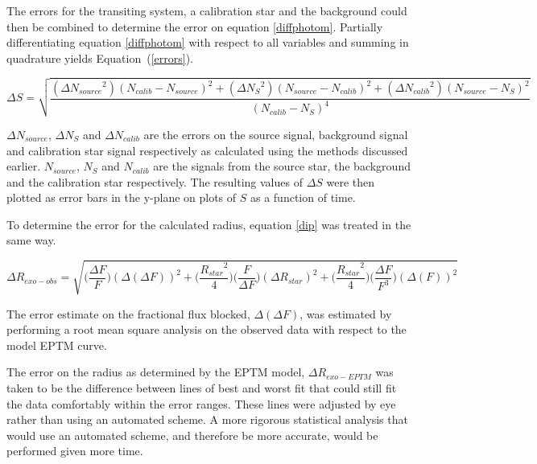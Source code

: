 \documentclass{report}
\begin{document}
The errors for the transiting system, a calibration star and the background could then be combined to determine the error on equation \ref{diffphotom}. Partially differentiating equation \ref{diffphotom} with respect to all variables and summing in quadrature yields Equation~(\ref{errors}).

\begin{equation} \label{errors}
    {\Delta S} = \sqrt{\frac{({\Delta N_{source}}^{2})(N_{calib}-N_{source})^{2} + ({\Delta N_{S}}^{2})(N_{source}-N_{calib})^2 + ({\Delta N_{calib}}^{2})(N_{source}-N_{S})^2}{(N_{calib}-N_{S})^4}}
\end{equation}

$\Delta N_{source}$, $\Delta N_{S}$ and $\Delta N_{calib}$ are the errors on the source signal, background signal and calibration star signal respectively as calculated using the methods discussed earlier. $N_{source}$, $N_{S}$ and $N_{calib}$ are the signals from the source star, the background and the calibration star respectively. The resulting values of $\Delta S$ were then plotted as error bars in the y-plane on plots of $S$ as a function of time.

To determine the error for the calculated radius, equation \ref{dip} was treated in the same way.

\begin{equation} \label{Rerror}
    \Delta R_{exo-obs} = \sqrt{\Big(\frac{\Delta F}{F}\Big)(\Delta (\Delta F))^2 + \Big(\frac{{R_{star}}^2}{4}\Big)\Big(\frac{F}{\Delta F}\Big)(\Delta {R_{star}})^2 + \Big(\frac{{R_{star}}^2}{4}\Big)\Big(\frac{\Delta F}{F^3}\Big)(\Delta (F))^2}
\end{equation}

The error estimate on the fractional flux blocked, $\Delta(\Delta F)$, was estimated by performing a root mean square analysis on the observed data with respect to the model EPTM curve. 

The error on the radius as determined by the EPTM model, $\Delta R_{exo-EPTM}$ was taken to be the difference between lines of best and worst fit that could still fit the data comfortably within the error ranges. These lines were adjusted by eye rather than using an automated scheme. A more rigorous statistical analysis that would use an automated scheme, and therefore be more accurate, would be performed given more time. 

\end{document}
